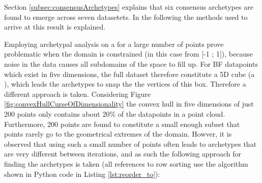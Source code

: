 Section \ref{subsec:consensusArchetypes} explains that six consensus archetypes are found to emerge across seven datasetets. In the following the methods used to arrive at this result is explained.

Employing archetypal analysis on a for a large number of points prove problematic when the domain is constrained (in this case from [-1 ; 1]), because noise in the data causes all subdomains of the space to fill up. For BF datapoints which exist in five dimensions, the full dataset therefore constitute a 5D cube (a ), which leads the archetypes to snap the the vertices of this box. Therefore a different approach is taken. Considering Figure \ref{fig:convexHullCurseOfDimensionality} the convex hull in five dimensions of just 200 points only contains about 20\% of the datapoints in a point cloud. Furthermore, 200 points are found to constitute a small enough subset that points rarely go to the geometrical extremes of the domain. Howver, it is observed that using such a small number of points often leads to archetypes that are very different between iterations, and as such the following approach for finding the archetypes is taken (all references to row sorting use the algorithm shown in Python code in Listing \ref{lst:reorder_to}):

